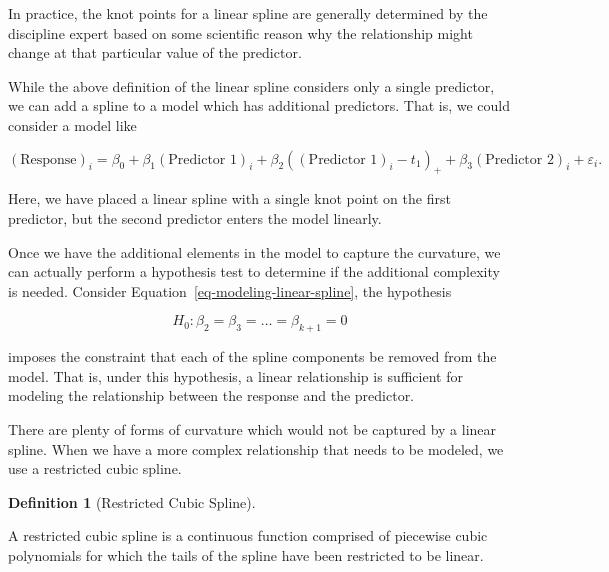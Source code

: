 \documentclass[
  letterpaper,
  DIV=11,
  numbers=noendperiod]{scrreprt}
\theoremstyle{definition}
\newtheorem{definition}{Definition}[chapter]
\theoremstyle{definition}
\theoremstyle{remark}
\begin{document}
\begin{tcolorbox}[enhanced jigsaw, left=2mm, toprule=.15mm, arc=.35mm, breakable, opacitybacktitle=0.6, opacityback=0, rightrule=.15mm, colbacktitle=quarto-callout-note-color!10!white, coltitle=black, leftrule=.75mm, toptitle=1mm, colframe=quarto-callout-note-color-frame, titlerule=0mm, title=\textcolor{quarto-callout-note-color}{\faInfo}\hspace{0.5em}{Note}, bottomrule=.15mm, colback=white, bottomtitle=1mm]

In practice, the knot points for a linear spline are generally
determined by the discipline expert based on some scientific reason why
the relationship might change at that particular value of the predictor.

\end{tcolorbox}

While the above definition of the linear spline considers only a single
predictor, we can add a spline to a model which has additional
predictors. That is, we could consider a model like

\[(\text{Response})_i = \beta_0 + \beta_1 (\text{Predictor 1})_i + \beta_2 \left((\text{Predictor 1})_i - t_1\right)_+ + \beta_3(\text{Predictor } 2)_i + \varepsilon_i.\]

Here, we have placed a linear spline with a single knot point on the
first predictor, but the second predictor enters the model linearly.

Once we have the additional elements in the model to capture the
curvature, we can actually perform a hypothesis test to determine if the
additional complexity is needed. Consider
Equation~\ref{eq-modeling-linear-spline}, the hypothesis

\[H_0: \beta_2 = \beta_3 = \dotsc = \beta_{k+1} = 0\]

imposes the constraint that each of the spline components be removed
from the model. That is, under this hypothesis, a linear relationship is
sufficient for modeling the relationship between the response and the
predictor.

There are plenty of forms of curvature which would not be captured by a
linear spline. When we have a more complex relationship that needs to be
modeled, we use a restricted cubic spline.

\begin{definition}[Restricted Cubic
Spline]\protect\hypertarget{def-restricted-cubic-spline}{}\label{def-restricted-cubic-spline}

A restricted cubic spline is a continuous function comprised of
piecewise cubic polynomials for which the tails of the spline have been
restricted to be linear.

\end{definition}
\end{document}
